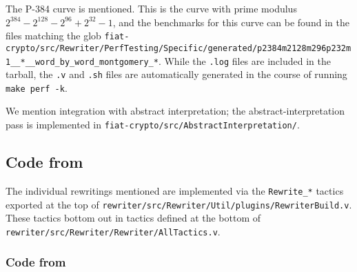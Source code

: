 \documentclass[sigplan,10pt,review,anonymous]{acmart}\settopmatter{printfolios=true,printccs=false,printacmref=false}
\begin{document}
The P-384 curve is mentioned.
This is the curve with prime modulus $2^{384} - 2^{128} - 2^{96} + 2^{32} - 1$, and the benchmarks for this curve can be found in the files matching the glob \texttt{fiat-crypto/src/Rewriter/PerfTesting/Specific/generated/p2384m2128m296p232m1\_\_*\_\_word\_by\_word\_montgomery\_*}.
While the \texttt{.log} files are included in the tarball, the \texttt{.v} and \texttt{.sh} files are automatically generated in the course of running \texttt{make perf -k}.

We mention integration with abstract interpretation; the abstract-interpretation pass is implemented in \texttt{fiat-crypto/src/AbstractInterpretation/}.

\subsection{Code from }

The individual rewritings mentioned are implemented via the \texttt{Rewrite\_*} tactics exported at the top of \texttt{rewriter/src/Rewriter/Util/plugins/RewriterBuild.v}.
These tactics bottom out in tactics defined at the bottom of \texttt{rewriter/src/Rewriter/Rewriter/AllTactics.v}.

\subsubsection{Code from } \label{sec:code:nine-steps}
\end{document}
